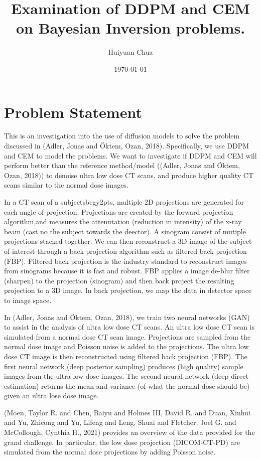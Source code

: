 \documentclass[a4paper, 11pt]{article}
\author{Huiyuan Chua}
\date{\today}
\title{Examination of DDPM and CEM on Bayesian Inversion problems.}
\begin{document}
\maketitle
\tableofcontents


\section{Problem Statement}
\label{sec:orgb75ed5d}
This is an investigation into the use of diffusion models to solve the problem discussed in (Adler, Jonas and Öktem, Ozan, 2018). Specifically, we use DDPM and CEM to model the problems. We want to investigate if DDPM and CEM will perform better than the reference method/model ((Adler, Jonas and Öktem, Ozan, 2018)) to denoise ultra low dose CT scans, and produce higher quality CT scans similar to the normal dose images.

In a CT scan of a subjectsbegy2pts, multiple 2D projections are generated for each angle of projection. Projections are created by the forward projection algorithm,and measures the attenutation (reduction in intensity) of the x-ray beam (cast no the subject towards the deector). A sinogram consist of mutiple projections stacked together. We can then reconstruct a 3D image of the subject of interest through a back projection algorithm such as filtered back projection (FBP). Filtered back projection is the industry standard to reconstruct images from sinograms because it is fast and robust. FBP applies a image de-blur filter (sharpen) to the projection (sinogram) and then back project the resulting projection to a 3D image. In back projection, we map the data in detector space to image space.

In (Adler, Jonas and Öktem, Ozan, 2018), we train two neural networks (GAN) to assist in the analysis of ultra low dose CT scans. An ultra low dose CT scan is simulated from a normal dose CT scan image. Projections are sampled from the normal dose image and Poisson noise is added to the projections. The ultra low dose CT image is then reconstructed using filtered back projection (FBP). The first neural network (deep posterior sampling) produces (high quality) sample images from the ultra low dose images. The second neural network (deep direct estimation) returns the mean and variance (of what the normal dose should be) given an ultra lose dose image.

(Moen, Taylor R. and Chen, Baiyu and Holmes III, David R. and Duan, Xinhui and Yu, Zhicong and Yu, Lifeng and Leng, Shuai and Fletcher, Joel G. and McCollough, Cynthia H., 2021) provides an overview of the data provided for the grand challenge. In particular, the low dose projection (DICOM-CT-PD) are simulated from the normal dose projections by adding Poisson noise.
\end{document}
